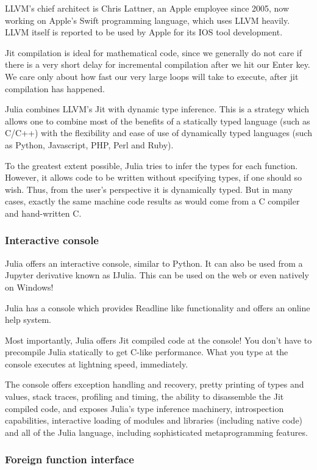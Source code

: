 \documentclass[a4paper,10pt]{article}
\begin{document}
LLVM's chief architect is Chris Lattner, an Apple employee since 2005, now working on Apple's 
Swift programming language, which uses LLVM heavily. LLVM itself is reported to be used by Apple
for its IOS tool development. 

Jit compilation is ideal for mathematical code, since we generally do not care if there is a very short
delay for incremental compilation after we hit our Enter key. We care only about how fast our very large
loops will take to execute, after jit compilation has happened.

Julia combines LLVM's Jit with dynamic type inference. This is a strategy which allows one to
combine most of the benefits of a statically typed language (such as C/C++) with the flexibility
and ease of use of dynamically typed languages (such as Python, Javascript, PHP, Perl and 
Ruby).

To the greatest extent possible, Julia tries to infer the types for each function. However, it
allows code to be written without specifying types, if one should so wish. Thus, from the user's
perspective it is dynamically typed. But in many cases, exactly the same machine code results as
would come from a C compiler and hand-written C. 

\subsubsection{Interactive console}

Julia offers an interactive console, similar to Python. It can also be used from a Jupyter derivative
known as IJulia. This can be used on the web or even natively on Windows!

Julia has a console which provides Readline like functionality and offers an online help 
system.

Most importantly, Julia offers Jit compiled code at the console! You don't have to precompile
Julia statically to get C-like performance. What you type at the console executes at lightning
speed, immediately.

The console offers exception handling and recovery, pretty printing of types and values, stack 
traces, profiling and timing, the ability to disassemble the Jit compiled code, and exposes 
Julia's type inference machinery, introspection capabilities, interactive loading of modules 
and libraries (including native code) and all of the Julia language, including sophisticated 
metaprogramming features. 

\subsubsection{Foreign function interface}
\end{document}
